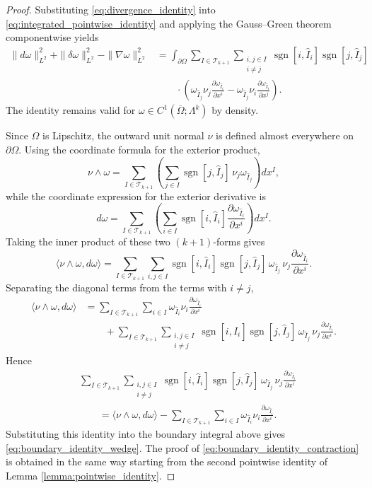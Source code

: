 \begin{proof}
Substituting \eqref{eq:divergence_identity} into
\eqref{eq:integrated_pointwise_identity} and applying the Gauss--Green theorem
componentwise yields
\[
\begin{aligned}
\|d\omega\|_{L^2}^2+\|\delta\omega\|_{L^2}^2-\|\nabla\omega\|_{L^2}^2
&=
\int_{\partial\Omega}
\sum_{I\in\mathscr T_{k+1}}
\sum_{\substack{i,j\in I\\ i\neq j}}
\operatorname{sgn}[i,\widehat I_i]
\operatorname{sgn}[j,\widehat I_j] \\
&\qquad\cdot
\left(
\omega_{\widehat I_j}\nu_j
\frac{\partial\omega_{\widehat I_i}}{\partial x^i}
-
\omega_{\widehat I_j}\nu_i
\frac{\partial\omega_{\widehat I_i}}{\partial x^j}
\right).
\end{aligned}
\]
The identity remains valid for $\omega\in C^1(\overline\Omega;\Lambda^k)$ by
density.

Since $\Omega$ is Lipschitz, the outward unit normal $\nu$ is defined almost
everywhere on $\partial\Omega$. Using the coordinate formula for the exterior
product,
\[
\nu\wedge\omega
=
\sum_{I\in\mathscr T_{k+1}}
\left(
\sum_{j\in I}
\operatorname{sgn}[j,\widehat I_j]\,
\nu_j\omega_{\widehat I_j}
\right)
dx^I,
\]
while the coordinate expression for the exterior derivative is
\[
d\omega
=
\sum_{I\in\mathscr T_{k+1}}
\left(
\sum_{i\in I}
\operatorname{sgn}[i,\widehat I_i]
\frac{\partial\omega_{\widehat I_i}}{\partial x^i}
\right)
dx^I.
\]
Taking the inner product of these two $(k+1)$-forms gives
\[
\langle\nu\wedge\omega,d\omega\rangle
=
\sum_{I\in\mathscr T_{k+1}}
\sum_{i,j\in I}
\operatorname{sgn}[i,\widehat I_i]
\operatorname{sgn}[j,\widehat I_j]
\,\omega_{\widehat I_j}\,
\nu_j
\frac{\partial\omega_{\widehat I_i}}{\partial x^i}.
\]
Separating the diagonal terms from the terms with $i\neq j$,
\[
\begin{aligned}
\langle\nu\wedge\omega,d\omega\rangle
&=
\sum_{I\in\mathscr T_{k+1}}
\sum_{i\in I}
\omega_{\widehat I_i}\nu_i
\frac{\partial\omega_{\widehat I_i}}{\partial x^i} \\
&\qquad+
\sum_{I\in\mathscr T_{k+1}}
\sum_{\substack{i,j\in I\\ i\neq j}}
\operatorname{sgn}[i,\widehat I_i]
\operatorname{sgn}[j,\widehat I_j]
\,\omega_{\widehat I_j}\,
\nu_j
\frac{\partial\omega_{\widehat I_i}}{\partial x^i}.
\end{aligned}
\]
Hence
\[
\begin{aligned}
&\sum_{I\in\mathscr T_{k+1}}
\sum_{\substack{i,j\in I\\ i\neq j}}
\operatorname{sgn}[i,\widehat I_i]
\operatorname{sgn}[j,\widehat I_j]
\,\omega_{\widehat I_j}\,
\nu_j
\frac{\partial\omega_{\widehat I_i}}{\partial x^i} \\
&\qquad=
\langle\nu\wedge\omega,d\omega\rangle
-
\sum_{I\in\mathscr T_{k+1}}
\sum_{i\in I}
\omega_{\widehat I_i}\nu_i
\frac{\partial\omega_{\widehat I_i}}{\partial x^i}.
\end{aligned}
\]
Substituting this identity into the boundary integral above gives
\eqref{eq:boundary_identity_wedge}. The proof of
\eqref{eq:boundary_identity_contraction} is obtained in the same way starting
from the second pointwise identity of Lemma
\ref{lemma:pointwise_identity}.
\end{proof}


